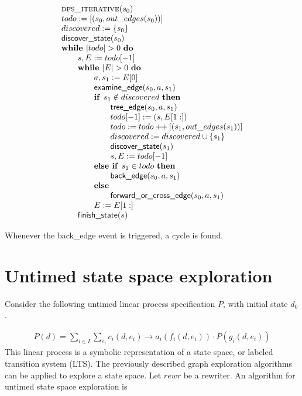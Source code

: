 \documentclass{article}
\newcommand{\concat}{\ensuremath{+\!\!+\:}}
\newcommand{\Space}{\text{\ }}
\newcommand{\If}{\text{\textbf{if }}}
\newcommand{\Do}{\text{\textbf{do }}}
\newcommand{\Then}{\text{\textbf{then }}}
\newcommand{\Else}{\text{\textbf{else }}}
\newcommand{\While}{\text{\textbf{while }}}
\begin{document}
\[
\begin{tabular}{l}
\textsc{dfs\_iterative}($s_0$) \\
$todo := [(s_0, out\_edges(s_0))]$ \\
$discovered := \{ s_0 \}$ \\
$\textsf{discover\_state}(s_0)$ \\
$\While |todo| > 0 \Space \Do$ \\
\qquad $s, E := todo[-1]$ \\
\qquad $\While |E| > 0 \Space \Do$ \\
\qquad \qquad $a, s_1 := E[0]$ \\
\qquad \qquad $\textsf{examine\_edge}(s_0, a, s_1)$ \\
\qquad \qquad $\If s_1 \notin discovered \Space \Then$ \\
\qquad \qquad \qquad $\textsf{tree\_edge}(s_0, a, s_1)$ \\
\qquad \qquad \qquad $todo[-1] := (s, E[1:])$ \\
\qquad \qquad \qquad $todo := todo \concat [(s_1, out\_edges(s_1))]$ \\
\qquad \qquad \qquad $discovered := discovered \cup \{ s_1 \}$ \\
\qquad \qquad \qquad $\textsf{discover\_state}(s_1)$ \\
\qquad \qquad \qquad $s, E := todo[-1]$ \\
\qquad \qquad $\Else \If s_1 \in todo \Space \Then$ \\
\qquad \qquad \qquad $\textsf{back\_edge}(s_0, a, s_1)$ \\
\qquad \qquad \Else \\
\qquad \qquad \qquad $\textsf{forward\_or\_cross\_edge}(s_0, a, s_1)$ \\
\qquad \qquad $E := E[1:]$ \\
\qquad $\textsf{finish\_state}(s)$ \\
\end{tabular}
\]

Whenever the \textsf{back\_edge} event is triggered, a cycle is found.

\newpage
\section{Untimed state space exploration}
Consider the following untimed linear process specification $P$, with initial state $d_0$. 

\[
\begin{array}{l}
P(d)=
\sum\limits_{i\in I}\sum\limits_{e_i}c_i(d, e_i)\rightarrow a_i(f_i(d,e_i)) \cdot P(g_i(d,e_i))
\end{array}
\]
This linear process is a symbolic representation of a state space, or labeled transition system
(LTS). The previously described graph exploration algorithms can be applied to explore a
state space. Let $rewr$ be a rewriter. An algorithm for untimed state space exploration is 
\end{document}
